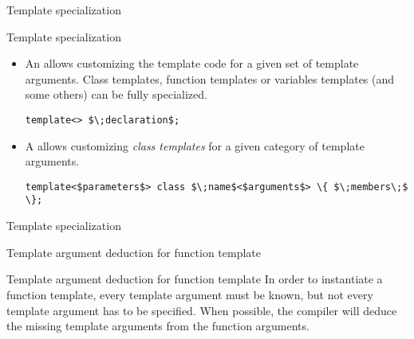 \begin{frame}{Template specialization}{}
  \begin{block}{Template specialization}
    \begin{itemize}
    \item
      An  allows customizing the template code for a given set of template arguments. Class templates, function templates or variables templates (and some others) can be fully specialized.
      \begin{center}
        \lstinline[mathescape]!template<> $\;declaration$;!
      \end{center}
    \item
      A  allows customizing \emph{class templates} for a given category of template arguments.
      \begin{center}
        \lstinline[mathescape]!template<$parameters$> class $\;name$<$arguments$> \{ $\;members\;$ \};!
      \end{center}
    \end{itemize}
  \end{block}
\end{frame}

\begin{frame}{Template specialization}{}
  \begin{example}
  \end{example}
\end{frame}


\begin{frame}{Template argument deduction for function template}{}
  \begin{block}{Template argument deduction for function template}
    In order to instantiate a function template, every template argument must be known, but not every template argument has to be specified. When possible, the compiler will deduce the missing template arguments from the function arguments.
  \end{block}

  \begin{example}
  \end{example}
\end{frame}

